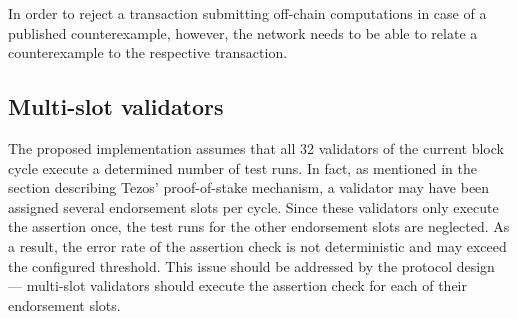 In order to reject a transaction submitting off-chain computations in case of a published counterexample, however, the network needs to be able to relate a counterexample to the respective transaction.  

\subsection{Multi-slot validators}
The proposed implementation assumes that all 32 validators of the current block cycle execute a determined number of test runs. In fact, as mentioned in the section describing Tezos' proof-of-stake mechanism, a validator may have been assigned several endorsement slots per cycle. Since these validators only execute the assertion once, the test runs for the other endorsement slots are neglected. As a result, the error rate of the assertion check is not deterministic and may exceed the configured threshold. This issue should be addressed by the protocol design --- multi-slot validators should execute the assertion check for each of their endorsement slots.